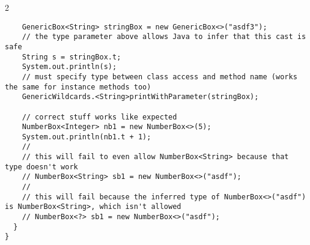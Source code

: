 \documentclass{article}
\def \columncount {2}
\begin{document}
\begin{multicols*}{\columncount}
\begin{outline}[longenum]
\begin{verbatim}
    GenericBox<String> stringBox = new GenericBox<>("asdf3");
    // the type parameter above allows Java to infer that this cast is safe
    String s = stringBox.t;
    System.out.println(s);
    // must specify type between class access and method name (works the same for instance methods too)
    GenericWildcards.<String>printWithParameter(stringBox);

    // correct stuff works like expected
    NumberBox<Integer> nb1 = new NumberBox<>(5);
    System.out.println(nb1.t + 1);
    //
    // this will fail to even allow NumberBox<String> because that type doesn't work
    // NumberBox<String> sb1 = new NumberBox<>("asdf");
    // 
    // this will fail because the inferred type of NumberBox<>("asdf") is NumberBox<String>, which isn't allowed
    // NumberBox<?> sb1 = new NumberBox<>("asdf");
  }
}
\end{verbatim}



\end{outline}
\end{multicols*}
\end{document}
